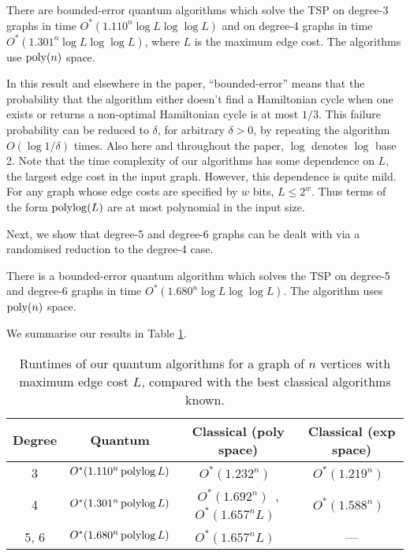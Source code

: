 \begin{theorem}
There are bounded-error quantum algorithms which solve the TSP on degree-3 graphs in time $O^*(1.110^n \log L \log \log L)$ and on degree-4 graphs in time $O^*(1.301^n \log L \log \log L)$, where $L$ is the maximum edge cost. The algorithms use $\operatorname{poly}(n)$ space.
\label{thm:deg34}
\end{theorem}

In this result and elsewhere in the paper, ``bounded-error'' means that the probability that the algorithm either doesn't find a Hamiltonian cycle when one exists or returns a non-optimal Hamiltonian cycle is at most $1/3$. This failure probability can be reduced to $\delta$, for arbitrary $\delta > 0$, by repeating the algorithm $O(\log 1/\delta)$ times. Also here and throughout the paper, $\log$ denotes $\log$ base 2. Note that the time complexity of our algorithms has some dependence on $L$, the largest edge cost in the input graph. However, this dependence is quite mild. For any graph whose edge costs are specified by $w$ bits, $L \le 2^w$. Thus terms of the form $\operatorname{polylog}(L)$ are at most polynomial in the input size.

Next, we show that degree-5 and degree-6 graphs can be dealt with via a randomised reduction to the degree-4 case.

\begin{theorem}
\label{thm:deg6}
There is a bounded-error quantum algorithm which solves the TSP on degree-5 and degree-6 graphs in time $O^*(1.680^n\log L \log \log L)$. The algorithm uses $\operatorname{poly}(n)$ space.
\end{theorem}

We summarise our results in Table \ref{tab:summary}.

\begin{table}
\begin{center}
\begin{tabular}{|c|c|c|c|}
\hline Degree & Quantum & Classical (poly space) & Classical (exp space) \\
\hline 3 & $O^*(1.110^n \operatorname{polylog} L)$ & $O^*(1.232^n)$~\cite{xiao2016degree3} & $O^*(1.219^n)$~\cite{bodlaender15} \\
 4 & $O^*(1.301^n \operatorname{polylog} L)$ & $O^*(1.692^n)$~\cite{xiao2016degree4}, $O^*(1.657^n L)$~\cite{bjorklund14} & $O^*(1.588^n)$~\cite{cygan11}\\
 5, 6 & $O^*(1.680^n \operatorname{polylog} L)$ & $O^*(1.657^n L)$~\cite{bjorklund14} & --- \\
\hline
\end{tabular}
\end{center}
\caption[Runtimes of our quantum algorithms for the Travelling Salesman Problem]{Runtimes of our quantum algorithms for a graph of $n$ vertices with maximum edge cost $L$, compared with the best classical algorithms known.}
\label{tab:summary}
\end{table}

